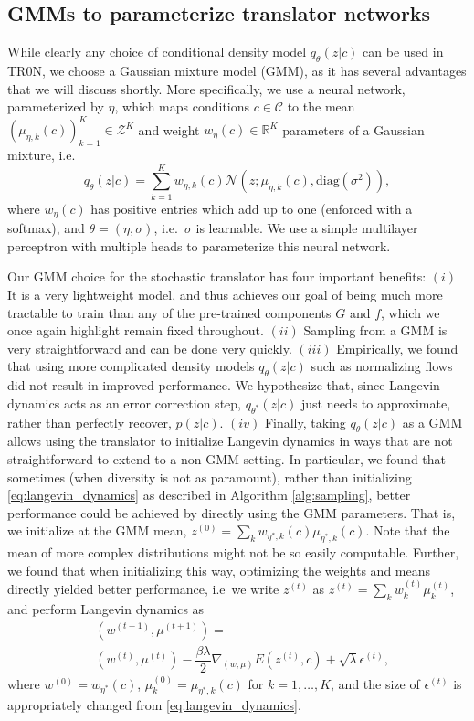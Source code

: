 \documentclass[nohyperref]{article}
\theoremstyle{plain}
\theoremstyle{definition}
\theoremstyle{remark}
\begin{document}
\subsection{GMMs to parameterize translator networks}\label{sec:gmm}

While clearly any choice of conditional density model $q_\theta(z|c)$ can be used in TR0N, we choose a Gaussian mixture model (GMM), as it has several advantages that we will discuss shortly. More specifically, we use a neural network, parameterized by $\eta$, which maps conditions $c \in \mathcal{C}$ to the mean $(\mu_{\eta, k}(c))_{k=1}^K \in \mathcal{Z}^K$ and weight $w_\eta(c) \in \mathbb{R}^K$ parameters of a Gaussian mixture, i.e.\
\begin{equation}
    q_\theta(z|c) = \sum_{k=1}^K w_{\eta, k}(c)\mathcal{N}(z; \mu_{\eta, k}(c), \text{diag}(\sigma^2)),
\end{equation}
where $w_\eta (c)$ has positive entries which add up to one (enforced with a softmax), and $\theta = (\eta, \sigma)$, i.e.\ $\sigma$ is learnable. 
We use a simple multilayer perceptron with multiple heads to parameterize this neural network.

Our GMM choice for the stochastic translator has four important benefits: $(i)$ It is a very lightweight model, and thus achieves our goal of being much more tractable to train than any of the pre-trained components $G$ and $f$, which we once again highlight remain fixed throughout. $(ii)$ Sampling from a GMM is very straightforward and can be done very quickly. $(iii)$ Empirically, we found that using more complicated density models $q_\theta(z|c)$ such as normalizing flows did not result in improved performance. We hypothesize that, since Langevin dynamics acts as an error correction step, $q_{\theta^*}(z|c)$ just needs to approximate, rather than perfectly recover, $p(z|c)$. $(iv)$ Finally, taking $q_\theta(z|c)$ as a GMM allows using the translator to initialize Langevin dynamics in ways that are not straightforward to extend to a non-GMM setting. In particular, we found that sometimes (when diversity is not as paramount), rather than initializing \eqref{eq:langevin_dynamics} as described in Algorithm \ref{alg:sampling}, better performance could be achieved by directly using the GMM parameters. That is, we initialize at the GMM mean, $z^{(0)} = \sum_k w_{\eta^*, k}(c) \mu_{\eta^*, k} (c)$. Note that the mean of more complex distributions might not be so easily computable. Further, we found that when initializing this way, optimizing the weights and means directly yielded better performance, i.e\ we write $z^{(t)}$ as $z^{(t)} = \sum_k w_k^{(t)} \mu_k^{(t)}$, and perform Langevin dynamics as
\begin{align}\label{eq:langevin_params}
&(w^{(t+1)}, \mu^{(t+1)}) = \\
& (w^{(t)}, \mu^{(t)}) -\dfrac{\beta \lambda}{2} \nabla_{(w,\mu)}E\left(z^{(t)}, c\right) + \sqrt{\lambda}\epsilon^{(t)},\nonumber
\end{align}
where $w^{(0)} = w_{\eta^*}(c)$, $\mu_k^{(0)} = \mu_{\eta^*, k}(c)$ for $k=1,\dots,K$, and the size of $\epsilon^{(t)}$ is appropriately changed from \eqref{eq:langevin_dynamics}.
\end{document}
